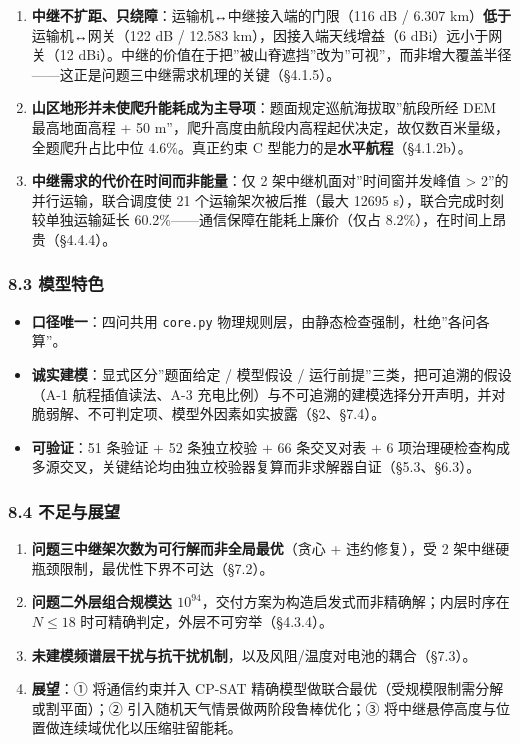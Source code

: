 \documentclass[
  10.5pt,
]{extarticle}
\providecommand{\tightlist}{%
  \setlength{\itemsep}{0pt}\setlength{\parskip}{0pt}}
\begin{document}
\begin{enumerate}
\def\labelenumi{\arabic{enumi}.}
\tightlist
\item
  \textbf{中继不扩距、只绕障}：运输机↔中继接入端的门限（116 dB / 6.307
  km）\textbf{低于}运输机↔网关（122 dB / 12.583
  km），因接入端天线增益（6 dBi）远小于网关（12
  dBi）。中继的价值在于把''被山脊遮挡''改为''可视''，而非增大覆盖半径------这正是问题三中继需求机理的关键（§4.1.5）。
\item
  \textbf{山区地形并未使爬升能耗成为主导项}：题面规定巡航海拔取''航段所经
  DEM 最高地面高程 + 50
  m''，爬升高度由航段内高程起伏决定，故仅数百米量级，全题爬升占比中位
  4.6\%。真正约束 C 型能力的是\textbf{水平航程}（§4.1.2b）。
\item
  \textbf{中继需求的代价在时间而非能量}：仅 2
  架中继机面对''时间窗并发峰值 \textgreater{} 2''的并行运输，联合调度使
  21 个运输架次被后推（最大 12695 s），联合完成时刻较单独运输延长
  60.2\%------通信保障在能耗上廉价（仅占
  8.2\%），在时间上昂贵（§4.4.4）。
\end{enumerate}

\subsubsection{8.3 模型特色}\label{ux6a21ux578bux7279ux8272}

\begin{itemize}
\tightlist
\item
  \textbf{口径唯一}：四问共用 \texttt{core.py}
  物理规则层，由静态检查强制，杜绝''各问各算''。
\item
  \textbf{诚实建模}：显式区分''题面给定 / 模型假设 /
  运行前提''三类，把可追溯的假设（A-1 航程插值读法、A-3
  充电比例）与不可追溯的建模选择分开声明，并对脆弱解、不可判定项、模型外因素如实披露（§2、§7.4）。
\item
  \textbf{可验证}：51 条验证 + 52 条独立校验 + 66 条交叉对表 + 6
  项治理硬检查构成多源交叉，关键结论均由独立校验器复算而非求解器自证（§5.3、§6.3）。
\end{itemize}

\subsubsection{8.4 不足与展望}\label{ux4e0dux8db3ux4e0eux5c55ux671b}

\begin{enumerate}
\def\labelenumi{\arabic{enumi}.}
\tightlist
\item
  \textbf{问题三中继架次数为可行解而非全局最优}（贪心 + 违约修复），受 2
  架中继硬瓶颈限制，最优性下界不可达（§7.2）。
\item
  \textbf{问题二外层组合规模达
  \(10^{94}\)}，交付方案为构造启发式而非精确解；内层时序在 \(N\le18\)
  时可精确判定，外层不可穷举（§4.3.4）。
\item
  \textbf{未建模频谱层干扰与抗干扰机制}，以及风阻/温度对电池的耦合（§7.3）。
\item
  \textbf{展望}：① 将通信约束并入 CP-SAT
  精确模型做联合最优（受规模限制需分解或割平面）；②
  引入随机天气情景做两阶段鲁棒优化；③
  将中继悬停高度与位置做连续域优化以压缩驻留能耗。
\end{enumerate}
\end{document}
